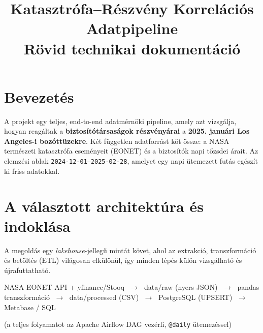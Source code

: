 \documentclass[11pt,a4paper]{article}
\title{\vspace{-1.5em}\textbf{Katasztrófa--Részvény Korrelációs Adatpipeline}\\[0.3em]
\large Rövid technikai dokumentáció}
\author{}
\date{}
\begin{document}
\maketitle
\vspace{-2.5em}

\section{Bevezetés}

A projekt egy teljes, end-to-end adatmérnöki pipeline, amely azt vizsgálja,
hogyan reagáltak a \textbf{biztosítótársaságok részvényárai} a
\textbf{2025. januári Los Angeles-i bozóttüzekre}. Két független adatforrást
köt össze: a NASA természeti katasztrófa eseményeit (EONET) és a biztosítók
napi tőzsdei árait. Az elemzési ablak \texttt{2024-12-01}--\texttt{2025-02-28},
amelyet egy napi ütemezett futás egészít ki friss adatokkal.

\section{A választott architektúra és indoklása}

A megoldás egy \emph{lakehouse}-jellegű mintát követ, ahol az extrakció,
transzformáció és betöltés (ETL) világosan elkülönül, így minden lépés külön
vizsgálható és újrafuttatható.

\begin{center}
\footnotesize
\textsf{NASA EONET API \; + \; yfinance/Stooq}
$\;\longrightarrow\;$ \textsf{data/raw (nyers JSON)}
$\;\longrightarrow\;$ \textsf{pandas transzformáció}
$\;\longrightarrow\;$ \textsf{data/processed (CSV)}
$\;\longrightarrow\;$ \textsf{PostgreSQL (UPSERT)}
$\;\longrightarrow\;$ \textsf{Metabase / SQL}
\end{center}
\vspace{-0.3em}
\begin{center}\footnotesize
(a teljes folyamatot az Apache Airflow DAG vezérli, \texttt{@daily} ütemezéssel)
\end{center}
\end{document}
